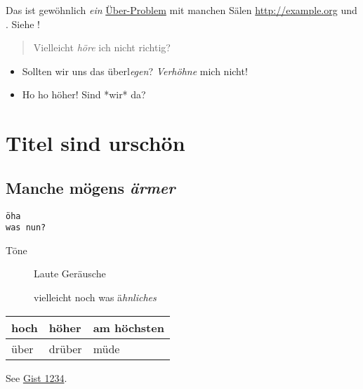 Das ist gewöhnlich \emph{ein} \href{http://example.org}{Über-Problem} mit manchen\newline
Sälen \href{http://example.org}{http://example.org} und . Siehe
!

\begin{quote}   %
Vielleicht \emph{höre} ich nicht richtig?
\end{quote}   %

\begin{itemize}
\item Sollten wir uns das überl\emph{egen}? \emph{Verhöhne} mich nicht!
\item Ho ho höher! Sind *wir* da?
\end{itemize}

\section{Titel sind urschön}\hypertarget{titel-sind-urschn}{}\label{titel-sind-urschn}

\subsection{Manche mögens \emph{ärmer}}\hypertarget{hot}{}\label{hot}

\begin{verbatim}öha
was nun?
\end{verbatim}

\begin{description}
\item[Töne] Laute Geräusche



vielleicht noch was ä\emph{hnliches}
\end{description}

\begin{longtable}{|l|l|l|}
\hline
hoch & höher & am höchsten\\
\hline
über & drüber & müde\\
\hline
\end{longtable}

See \href{https://gist.github.com/1234}{Gist 1234}.

